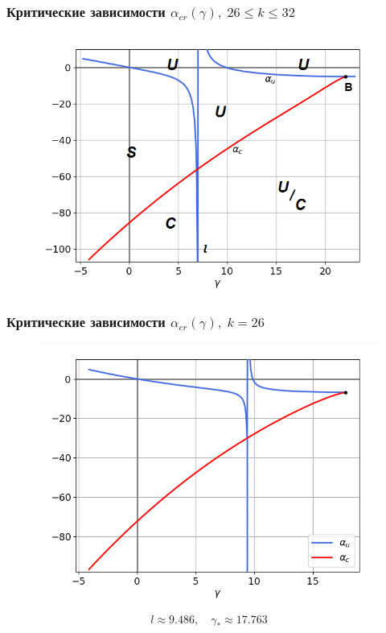 \documentclass[fullscreen=true, unicode, bookmarks=false]{beamer}
\begin{document}
\begin{frame}
\frametitle{ Критические зависимости $ \alpha_{cr}(\gamma), \; 26 \leqslant k \leqslant 32 $ }

\begin{figure} 
\includegraphics[scale=0.59]{scheme2632.png}  
\end{figure}

\end{frame}

\begin{frame}
\frametitle{ Критические зависимости $ \alpha_{cr}(\gamma), \; k = 26 $ }

\begin{figure} 
\includegraphics[scale=0.55]{alphas_051.png}  
\end{figure}
$$ l \approx 9.486, \quad \gamma_* \approx 17.763 $$

\end{frame}
\end{document}
